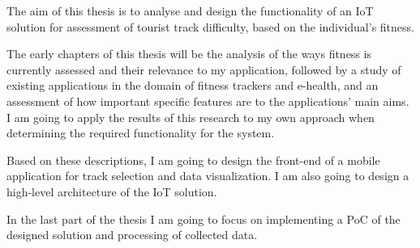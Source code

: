 The aim of this thesis is to analyse and design the functionality of an IoT solution for assessment of tourist track difficulty, based on the individual's fitness.

The early chapters of this thesis will be the analysis of the ways fitness is currently assessed and their relevance to my application,
followed by a study of existing applications in the domain of fitness trackers and e-health, and an assessment of how important specific features are to the applications' main aims.
I am going to apply the results of this research to my own approach when determining the required functionality for the system.

Based on these descriptions, I am going to design the front-end of a mobile application for track selection and data visualization.
I am also going to design a high-level architecture of the IoT solution.

In the last part of the thesis I am going to focus on implementing a PoC of the designed solution and processing of collected data.
